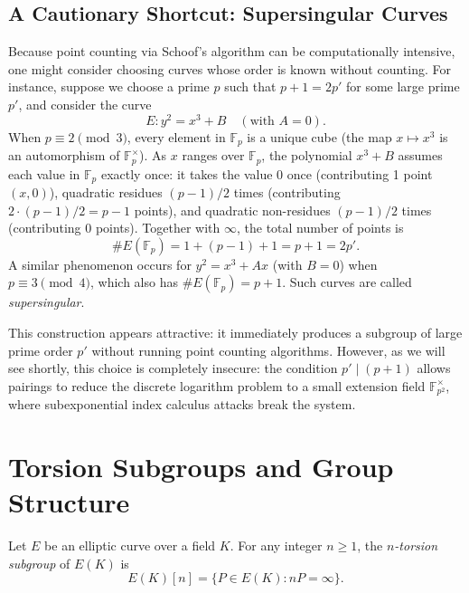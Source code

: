 \subsection*{A Cautionary Shortcut: Supersingular Curves}

Because point counting via Schoof's algorithm can be computationally intensive, one might consider choosing curves whose order is known without counting.
For instance, suppose we choose a prime \(p\) such that \(p + 1 = 2p'\) for some large prime \(p'\), and consider the curve
\[
    E \colon y^2 = x^3 + B \quad (\text{with } A = 0).
\]
When \(p \equiv 2 \pmod{3}\), every element in \(\mathbb{F}_p\) is a unique cube (the map \(x \mapsto x^3\) is an automorphism of \(\mathbb{F}_p^\times\)).
As \(x\) ranges over \(\mathbb{F}_p\), the polynomial \(x^3 + B\) assumes each value in \(\mathbb{F}_p\) exactly once:
it takes the value \(0\) once (contributing 1 point \((x, 0)\)), quadratic residues \((p-1)/2\) times (contributing \(2 \cdot (p-1)/2 = p-1\) points), and quadratic non-residues \((p-1)/2\) times (contributing 0 points).
Together with \(\infty\), the total number of points is
\[
    \#E(\mathbb{F}_p) = 1 + (p - 1) + 1 = p + 1 = 2p'.
\]
A similar phenomenon occurs for \(y^2 = x^3 + Ax\) (with \(B = 0\)) when \(p \equiv 3 \pmod{4}\), which also has \(\#E(\mathbb{F}_p) = p + 1\).
Such curves are called \emph{supersingular}.

This construction appears attractive: it immediately produces a subgroup of large prime order \(p'\) without running point counting algorithms.
However, as we will see shortly, this choice is completely insecure: the condition \(p' \mid (p + 1)\) allows pairings to reduce the discrete logarithm problem to a small extension field \(\mathbb{F}_{p^2}^\times\), where subexponential index calculus attacks break the system.

\section*{Torsion Subgroups and Group Structure}

\begin{definition}\label{def:torsion}
    Let \(E\) be an elliptic curve over a field \(K\). For any integer \(n \geq 1\), the \emph{\(n\)-torsion subgroup} of \(E(K)\) is
    \[
        E(K)[n] = \{ P \in E(K) : nP = \infty \}.
    \]
\end{definition}

